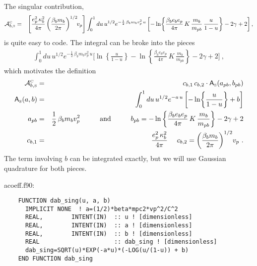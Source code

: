 \documentclass[preprint,12pt,eqsecnum,nofootinbib,amsmath,amssymb]{revtex4}
\newcommand{\smC}{{\rm\scriptscriptstyle C}}
\newcommand{\smS}{{\rm\scriptscriptstyle S}}
\begin{document}
{{The singular contribution,
\begin{eqnarray}
  {\cal A}^\smC_{b,\smS} 
  &=& 
  \left[
  \frac{e_p^2\, \kappa_b^2}{4\pi}
  \left( \frac{\beta_b m_b}{2\pi} \right)^{1/2} \!\! v_p
  \right]
  \int_0^1 du\, u^{1/2} e^{-\frac{1}{2}\, \beta_b m_b v_p^2 \,u}
  \left[-\ln\!\left\{\frac{\beta_b e_b e_p}{4\pi}\,K\,
  \frac{m_b}{m_{pb}}\,\frac{u}{1-u} \right\} 
  -2\gamma + 2
  \right] ,
\nonumber\\
\end{eqnarray}
is quite easy to code. The integral can be broke into the pieces
\begin{eqnarray}
  \int_0^1 du\, u^{1/2} e^{-\frac{1}{2}\, \beta_b m_b v_p^2 \,u}
  \Bigg[\ln\!\left\{\frac{u}{1-u} \right\} 
  -\ln\left\{\frac{\beta_b e_b e_p}{4\pi}\,K\,
  \frac{m_b}{m_{pb}}\right\} 
  -2\gamma + 2 \Bigg] \ ,
\end{eqnarray}
which motivates the definition
\begin{eqnarray}
  {\cal A}^\smC_{b,\smS} 
  &=& 
  c_{b, 1}\, c_{b, 2} 
  \cdot 
  {\sf A}_\smS(a_{pb},b_{pb})
\\
  {\sf A}_\smS(a,b)
  &=&
  \int_0^1 du\, u^{1/2} e^{-a \,u}
  \left[-\ln\!\left\{\frac{u}{1-u} \right\} + b \right]
\\
  a_{pb} &=& \frac{1}{2}\, \beta_b m_b v_p^2
  \hskip1cm 
  \text{and}
  \hskip1cm 
  b_{pb} =
  -\ln\left\{\frac{\beta_b e_b e_p}{4\pi}\,K\,
  \frac{m_b}{m_{pb}}\right\} -2\gamma + 2 
\\
  c_{b, 1} &=& \frac{e_p^2\, \kappa_b^2}{4\pi}
  ~~~~
  c_{b, 2} =
  \left( \frac{\beta_b m_b}{2\pi} \right)^{1/2} \! v_p  \ .
\end{eqnarray}
The term involving $b$ can be integrated exactly, but we will use
Gaussian quadrature for both pieces. 

\vskip0.5cm 
\noindent
acoeff.f90:
{
\baselineskip 10pt
\begin{verbatim}
    FUNCTION dab_sing(u, a, b)
      IMPLICIT NONE  ! a=(1/2)*beta*mpc2*vp^2/C^2
      REAL,        INTENT(IN)  :: u ! [dimensionless]
      REAL,        INTENT(IN)  :: a ! [dimensionless] 
      REAL,        INTENT(IN)  :: b ! [dimensionless]
      REAL                     :: dab_sing ! [dimensionless]
      dab_sing=SQRT(u)*EXP(-a*u)*(-LOG(u/(1-u)) + b)
    END FUNCTION dab_sing
\end{verbatim}
}

}}
\end{document}
